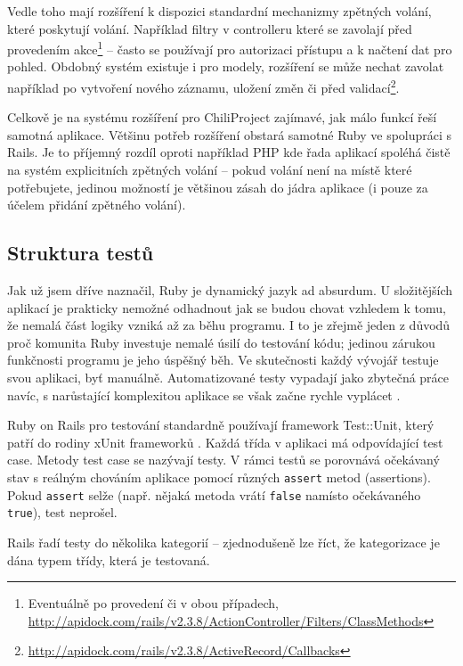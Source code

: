 \documentclass[thesis=B,czech]{FITthesis}[2012/05/02]
\begin{document}
Vedle toho mají rozšíření k dispozici standardní mechanizmy zpětných
volání, které poskytují volání. Například filtry v controlleru které se
zavolají před provedením akce\footnote{Eventuálně po provedení či v obou
  případech,
  \url{http://apidock.com/rails/v2.3.8/ActionController/Filters/ClassMethods}}
-- často se používají pro autorizaci přístupu a k načtení dat pro
pohled. Obdobný systém existuje i pro modely, rozšíření se může nechat
zavolat například po vytvoření nového záznamu, uložení změn či před
validací\footnote{\url{http://apidock.com/rails/v2.3.8/ActiveRecord/Callbacks}}.

Celkově je na systému rozšíření pro ChiliProject zajímavé, jak málo
funkcí řeší samotná aplikace. Většinu potřeb rozšíření obstará samotné
Ruby ve spolupráci s Rails. Je to příjemný rozdíl oproti například PHP
kde řada aplikací spoléhá čistě na systém explicitních zpětných volání
-- pokud volání není na místě které potřebujete, jedinou možností je
většinou zásah do jádra aplikace (i pouze za účelem přidání zpětného
volání).

\subsection{Struktura testů}

\label{sec:rails_tests}

Jak už jsem dříve naznačil, Ruby je dynamický jazyk ad absurdum. U
složitějších aplikací je prakticky nemožné odhadnout jak se budou chovat
vzhledem k tomu, že nemalá část logiky vzniká až za běhu programu. I to
je zřejmě jeden z důvodů proč komunita Ruby investuje nemalé úsilí do
testování kódu; jedinou zárukou funkčnosti programu je jeho úspěšný běh.
Ve skutečnosti každý vývojář testuje svou aplikaci, byť manuálně.
Automatizované testy vypadají jako zbytečná práce navíc, s narůstající
komplexitou aplikace se však začne rychle vyplácet \citep{Rappin2011}.

Ruby on Rails pro testování standardně používají framework Test::Unit,
který patří do rodiny xUnit frameworků \citep{FowlerXunit}. Každá třída
v aplikaci má odpovídající test case. Metody test case se nazývají
testy. V rámci testů se porovnává očekávaný stav s reálným chováním
aplikace pomocí různých \lstinline!assert! metod (assertions). Pokud
\lstinline!assert! selže (např. nějaká metoda vrátí \lstinline!false!
namísto očekávaného \lstinline!true!), test neprošel.

Rails řadí testy do několika kategorií -- zjednodušeně lze říct, že
kategorizace je dána typem třídy, která je testovaná.
\end{document}

